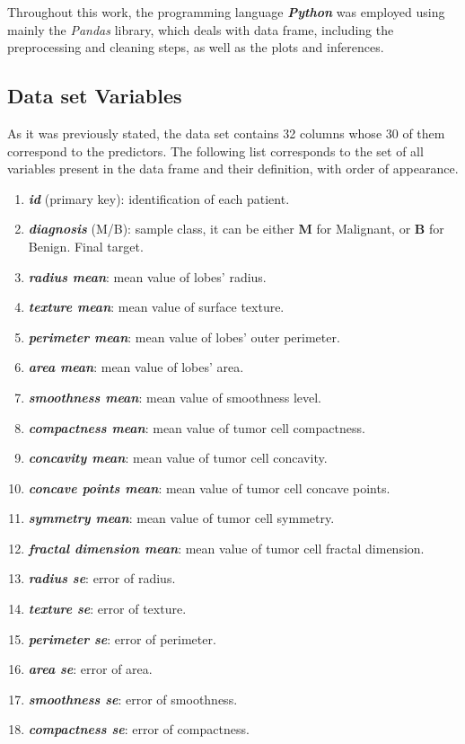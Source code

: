 \documentclass[conference]{IEEEtran}
\begin{document}
Throughout this work, the programming language \textit{\textbf{Python}} was employed 
using mainly the \textit{Pandas} library, which deals with data frame, including the 
preprocessing and cleaning steps, as well as the plots and inferences. 


\subsection{Data set Variables}

As it was previously stated, the data set contains 32 columns whose 30 of them 
correspond to the predictors. The following list corresponds to the set of all 
variables present in the data frame and their definition, with order of appearance. 

\begin{enumerate}
     \item \textbf{\textit{id}} (primary key): identification of each patient.
     \item \textbf{\textit{diagnosis}} (M/B): sample class, it can be either \textbf{M} for Malignant, 
     or \textbf{B} for Benign. Final target.
     
     \item \textbf{\textit{radius mean}}: mean value of lobes' radius.
     \item \textbf{\textit{texture mean}}: mean value of surface texture.
     \item \textbf{\textit{perimeter mean}}: mean value of lobes' outer perimeter.
     \item \textbf{\textit{area mean}}: mean value of lobes' area.
     \item \textbf{\textit{smoothness mean}}: mean value of smoothness level.
     
     \item \textbf{\textit{compactness mean}}: mean value of tumor cell compactness.
     \item \textbf{\textit{concavity mean}}: mean value of tumor cell concavity.
     \item \textbf{\textit{concave points mean}}: mean value of tumor cell concave points.
     \item \textbf{\textit{symmetry mean}}: mean value of tumor cell symmetry.
     \item \textbf{\textit{fractal dimension mean}}: mean value of tumor cell fractal dimension.
     
     \item \textbf{\textit{radius se}}: error of radius.
     \item \textbf{\textit{texture se}}: error of texture.
     \item \textbf{\textit{perimeter se}}: error of perimeter.
     \item \textbf{\textit{area se}}: error of area.
     \item \textbf{\textit{smoothness se}}: error of smoothness.
     \item \textbf{\textit{compactness se}}: error of compactness.
     

\end{enumerate}
\end{document}
